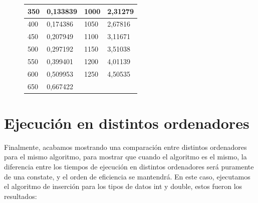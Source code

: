 \documentclass[11pt,openany]{book}
\begin{document}
\begin{figure}[H]
\begin{minipage}{0.5\textwidth}
\begin{tabular}{|l|l|l|l|}
        350 & 0,133839 & 1000 & 2,31279 \\ \hline
        400 & 0,174386 & 1050 & 2,67816 \\ \hline
        450 & 0,207949 & 1100 & 3,11671 \\ \hline
        500 & 0,297192 & 1150 & 3,51038 \\ \hline
        550 & 0,399401 & 1200 & 4,01139 \\ \hline
        600 & 0,509953 & 1250 & 4,50535 \\ \hline
        650 & 0,667422 & ~ & \\ \hline
        \end{tabular}
    \end{minipage}
\end{figure}

\section{Ejecución en distintos ordenadores}
Finalmente, acabamos mostrando una comparación entre distintos ordenadores para el mismo algoritmo, para mostrar que cuando
el algoritmo es el mismo, la diferencia entre los tiempos de ejecución en distintos ordenadores será puramente de una constate, 
y el orden de eficiencia se mantendrá. En este caso, ejecutamos el algoritmo de inserción para los tipos de datos int y double, estos
fueron los resultados:
\end{document}
